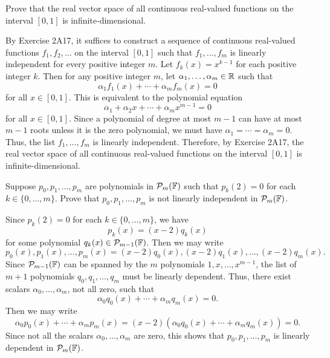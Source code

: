 \begin{exc}
\begin{exercise}
Prove that the real vector space of all continuous real-valued functions on the
interval $[0,1]$ is infinite-dimensional.
\end{exercise}
\begin{solution}
By Exercise 2A17, it suffices to construct a sequence of continuous real-valued
functions $f_1,f_2,\dots$ on the interval $[0,1]$ such that $f_1,\dots,f_m$ is
linearly independent for every positive integer $m$. Let $f_k(x)=x^{k-1}$ for
each positive integer $k$. Then for any positive integer $m$, let
$\alpha_1,\dots,\alpha_m\in\mathbb{R}$ such that
\[ \alpha_1f_1(x)+\cdots+\alpha_mf_m(x)=0 \]
for all $x\in[0,1]$. This is equivalent to the polynomial equation
\[ \alpha_1+\alpha_2x+\cdots+\alpha_mx^{m-1}=0 \]
for all $x\in[0,1]$. Since a polynomial of degree at most $m-1$ can have at
most $m-1$ roots unless it is the zero polynomial, we must have
$\alpha_1=\cdots=\alpha_m=0$. Thus, the list $f_1,\dots,f_m$ is linearly
independent. Therefore, by Exercise 2A17, the real vector space of all
continuous real-valued functions on the interval $[0,1]$ is
infinite-dimensional.
\end{solution}

\begin{exercise}
Suppose $p_0,p_1,\dots,p_m$ are polynomials in $\mathcal{P}_m(\mathbb{F})$ such that
$p_k(2)=0$ for each $k\in\{0,\dots,m\}$. Prove that $p_0,p_1,\dots,p_m$ is not
linearly independent in $\mathcal{P}_m(\mathbb{F})$.
\end{exercise}
\begin{solution}
Since $p_k(2)=0$ for each $k\in\{0,\dots,m\}$, we have
\[ p_k(x)=(x-2)q_k(x) \]
for some polynomial $q_k(x)\in\mathcal{P}_{m-1}(\mathbb{F})$. Then we may write
\[ p_0(x),p_1(x),\dots,p_m(x)=(x-2)q_0(x),(x-2)q_1(x),\dots,(x-2)q_m(x). \]
Since $\mathcal{P}_{m-1}(\mathbb{F})$ can be spanned by the $m$ polynomials
$1,x,\dots,x^{m-1}$, the list of $m+1$ polynomials $q_0,q_1,\dots,q_m$ must be
linearly dependent. Thus, there exist scalars $\alpha_0,\dots,\alpha_m$, not
all zero, such that
\[ \alpha_0q_0(x)+\cdots+\alpha_mq_m(x)=0. \]
Then we may write
\[ \alpha_0p_0(x)+\cdots+\alpha_mp_m(x)
   =(x-2)(\alpha_0q_0(x)+\cdots+\alpha_mq_m(x))=0. \]
Since not all the scalars $\alpha_0,\dots,\alpha_m$ are zero, this shows that
$p_0,p_1,\dots,p_m$ is linearly dependent in $\mathcal{P}_m(\mathbb{F})$.
\end{solution}
\end{exc}
